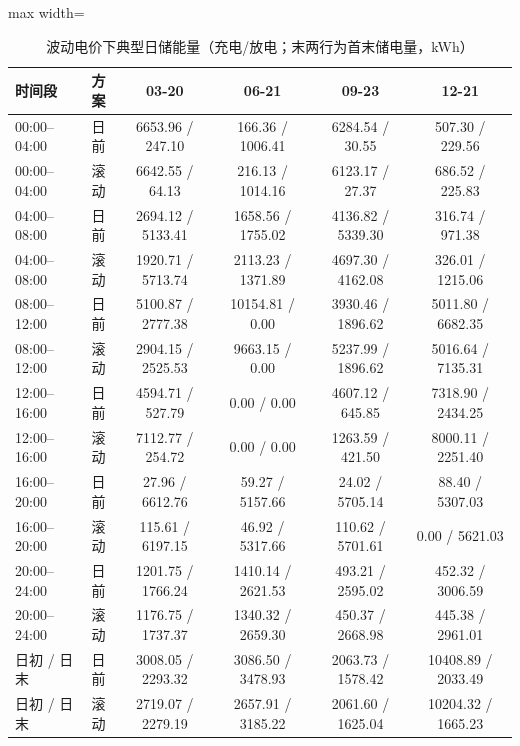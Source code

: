 \documentclass[UTF8,a4paper,zihao=-4,fontset=windows]{ctexart}
\begin{document}
\begin{table}[H]\centering\caption{波动电价下典型日储能量（充电/放电；末两行为首末储电量，kWh）}
\fontsize{9.5}{12}\selectfont\setlength{\tabcolsep}{4pt}\renewcommand{\arraystretch}{1.12}
\begin{adjustbox}{max width=\linewidth}\begin{tabular}{lccccc}\toprule
时间段 & 方案 & 03-20 & 06-21 & 09-23 & 12-21\\\midrule
00:00–04:00 & 日前 & 6653.96 / 247.10 & 166.36 / 1006.41 & 6284.54 / 30.55 & 507.30 / 229.56\\
00:00–04:00 & 滚动 & 6642.55 / 64.13 & 216.13 / 1014.16 & 6123.17 / 27.37 & 686.52 / 225.83\\
04:00–08:00 & 日前 & 2694.12 / 5133.41 & 1658.56 / 1755.02 & 4136.82 / 5339.30 & 316.74 / 971.38\\
04:00–08:00 & 滚动 & 1920.71 / 5713.74 & 2113.23 / 1371.89 & 4697.30 / 4162.08 & 326.01 / 1215.06\\
08:00–12:00 & 日前 & 5100.87 / 2777.38 & 10154.81 / 0.00 & 3930.46 / 1896.62 & 5011.80 / 6682.35\\
08:00–12:00 & 滚动 & 2904.15 / 2525.53 & 9663.15 / 0.00 & 5237.99 / 1896.62 & 5016.64 / 7135.31\\
12:00–16:00 & 日前 & 4594.71 / 527.79 & 0.00 / 0.00 & 4607.12 / 645.85 & 7318.90 / 2434.25\\
12:00–16:00 & 滚动 & 7112.77 / 254.72 & 0.00 / 0.00 & 1263.59 / 421.50 & 8000.11 / 2251.40\\
16:00–20:00 & 日前 & 27.96 / 6612.76 & 59.27 / 5157.66 & 24.02 / 5705.14 & 88.40 / 5307.03\\
16:00–20:00 & 滚动 & 115.61 / 6197.15 & 46.92 / 5317.66 & 110.62 / 5701.61 & 0.00 / 5621.03\\
20:00–24:00 & 日前 & 1201.75 / 1766.24 & 1410.14 / 2621.53 & 493.21 / 2595.02 & 452.32 / 3006.59\\
20:00–24:00 & 滚动 & 1176.75 / 1737.37 & 1340.32 / 2659.30 & 450.37 / 2668.98 & 445.38 / 2961.01\\
日初 / 日末 & 日前 & 3008.05 / 2293.32 & 3086.50 / 3478.93 & 2063.73 / 1578.42 & 10408.89 / 2033.49\\
日初 / 日末 & 滚动 & 2719.07 / 2279.19 & 2657.91 / 3185.22 & 2061.60 / 1625.04 & 10204.32 / 1665.23\\
\bottomrule\end{tabular}\end{adjustbox}\end{table}
\end{document}
